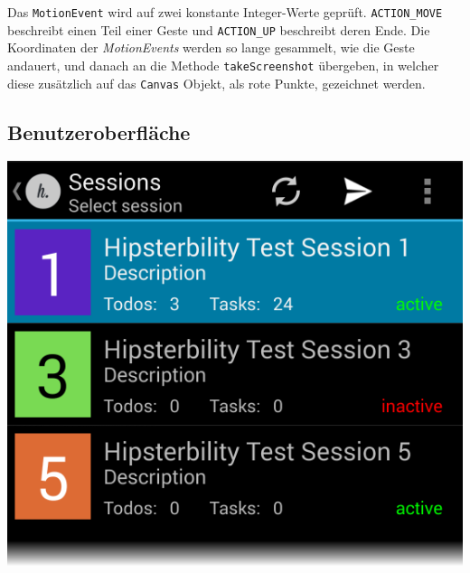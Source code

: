  Das \texttt{MotionEvent} wird auf zwei konstante Integer-Werte geprüft. 
 \texttt{ACTION\_MOVE} beschreibt einen Teil einer Geste und \texttt{ACTION\_UP} beschreibt deren Ende.
 Die Koordinaten der \emph{MotionEvents} werden so lange gesammelt, wie die Geste andauert, und danach an die Methode \texttt{takeScreenshot} übergeben, in welcher diese zusätzlich auf das \texttt{Canvas} Objekt, als rote Punkte,  gezeichnet werden.

\subsection{Benutzeroberfläche}
\begin{minipage}[t]{0.45\linewidth}
	\centering
	\includegraphics[width=\linewidth]{img/screen_session_list}
	 \label{fig:screen_sessions}
\end{minipage}
\hfill
